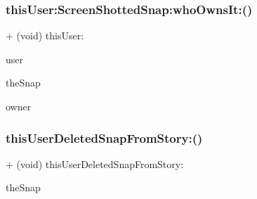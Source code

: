 \hypertarget{interface_command_factory_a2c6cb3673a158b7a668dc642ff4d795c}{}\label{interface_command_factory_a2c6cb3673a158b7a668dc642ff4d795c} 
\subsubsection{\texorpdfstring{this\+User\+:\+Screen\+Shotted\+Snap\+:who\+Owns\+It\+:()}{thisUser:ScreenShottedSnap:whoOwnsIt:()}}
{\footnotesize\ttfamily + (void) this\+User\+: \begin{DoxyParamCaption}\item[{(N\+S\+String $\ast$)}]{user }\item[{ScreenShottedSnap:(\hyperlink{interface_snap}{Snap} $\ast$)}]{the\+Snap }\item[{whoOwnsIt:(N\+S\+String $\ast$)}]{owner }\end{DoxyParamCaption}}

\hypertarget{interface_command_factory_a1b6d6ea45699e302c3f893097a15d8a8}{}\label{interface_command_factory_a1b6d6ea45699e302c3f893097a15d8a8} 
\subsubsection{\texorpdfstring{this\+User\+Deleted\+Snap\+From\+Story\+:()}{thisUserDeletedSnapFromStory:()}}
{\footnotesize\ttfamily + (void) this\+User\+Deleted\+Snap\+From\+Story\+: \begin{DoxyParamCaption}\item[{(\hyperlink{interface_snap}{Snap} $\ast$)}]{the\+Snap }\end{DoxyParamCaption}}

\hypertarget{interface_command_factory_a9d8bd168e2d18eb390fd0954e4363f6f}{}\label{interface_command_factory_a9d8bd168e2d18eb390fd0954e4363f6f} 
